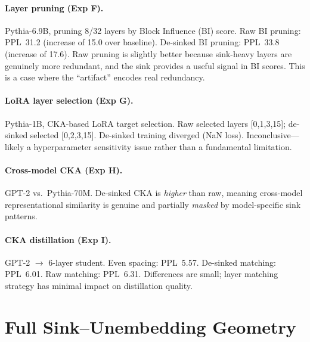\documentclass[11pt]{article}
\begin{document}
\paragraph{Layer pruning (Exp F).}
Pythia-6.9B, pruning 8/32 layers by Block Influence (BI) score. Raw BI pruning: PPL~31.2 (increase of 15.0 over baseline). De-sinked BI pruning: PPL~33.8 (increase of 17.6). Raw pruning is slightly better because sink-heavy layers are genuinely more redundant, and the sink provides a useful signal in BI scores. This is a case where the ``artifact'' encodes real redundancy.

\paragraph{LoRA layer selection (Exp G).}
Pythia-1B, CKA-based LoRA target selection. Raw selected layers [0,1,3,15]; de-sinked selected [0,2,3,15]. De-sinked training diverged (NaN loss). Inconclusive---likely a hyperparameter sensitivity issue rather than a fundamental limitation.

\paragraph{Cross-model CKA (Exp H).}
GPT-2 vs.\ Pythia-70M. De-sinked CKA is \emph{higher} than raw, meaning cross-model representational similarity is genuine and partially \emph{masked} by model-specific sink patterns.

\paragraph{CKA distillation (Exp I).}
GPT-2 $\to$ 6-layer student. Even spacing: PPL~5.57. De-sinked matching: PPL~6.01. Raw matching: PPL~6.31. Differences are small; layer matching strategy has minimal impact on distillation quality.

\section{Full Sink--Unembedding Geometry}\label{app:geometry}
\end{document}
